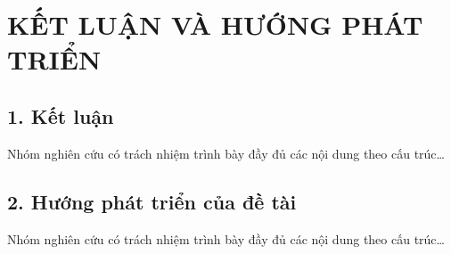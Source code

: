 \chapter*{KẾT LUẬN VÀ HƯỚNG PHÁT TRIỂN}

\section*{1. Kết luận}
Nhóm nghiên cứu có trách nhiệm trình bày đầy đủ các nội dung theo cấu trúc\ldots

\section*{2. Hướng phát triển của đề tài}
Nhóm nghiên cứu có trách nhiệm trình bày đầy đủ các nội dung theo cấu trúc\ldots